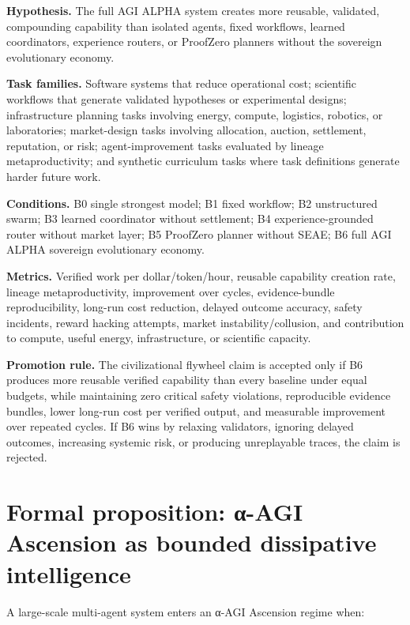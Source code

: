 \documentclass[11pt]{article}
\begin{document}
\textbf{Hypothesis.} The full AGI ALPHA system creates more reusable, validated, compounding capability than isolated agents, fixed workflows, learned coordinators, experience routers, or ProofZero planners without the sovereign evolutionary economy.

\textbf{Task families.} Software systems that reduce operational cost; scientific workflows that generate validated hypotheses or experimental designs; infrastructure planning tasks involving energy, compute, logistics, robotics, or laboratories; market-design tasks involving allocation, auction, settlement, reputation, or risk; agent-improvement tasks evaluated by lineage metaproductivity; and synthetic curriculum tasks where task definitions generate harder future work.

\textbf{Conditions.} B0 single strongest model; B1 fixed workflow; B2 unstructured swarm; B3 learned coordinator without settlement; B4 experience-grounded router without market layer; B5 ProofZero planner without SEAE; B6 full AGI ALPHA sovereign evolutionary economy.

\textbf{Metrics.} Verified work per dollar/token/hour, reusable capability creation rate, lineage metaproductivity, improvement over cycles, evidence-bundle reproducibility, long-run cost reduction, delayed outcome accuracy, safety incidents, reward hacking attempts, market instability/collusion, and contribution to compute, useful energy, infrastructure, or scientific capacity.

\textbf{Promotion rule.} The civilizational flywheel claim is accepted only if B6 produces more reusable verified capability than every baseline under equal budgets, while maintaining zero critical safety violations, reproducible evidence bundles, lower long-run cost per verified output, and measurable improvement over repeated cycles. If B6 wins by relaxing validators, ignoring delayed outcomes, increasing systemic risk, or producing unreplayable traces, the claim is rejected.

\section{Formal proposition: α-AGI Ascension as bounded dissipative intelligence}\label{formal-proposition-ux3b1-agi-ascension-as-bounded-dissipative-intelligence}

A large-scale multi-agent system enters an α-AGI Ascension regime when:
\end{document}
